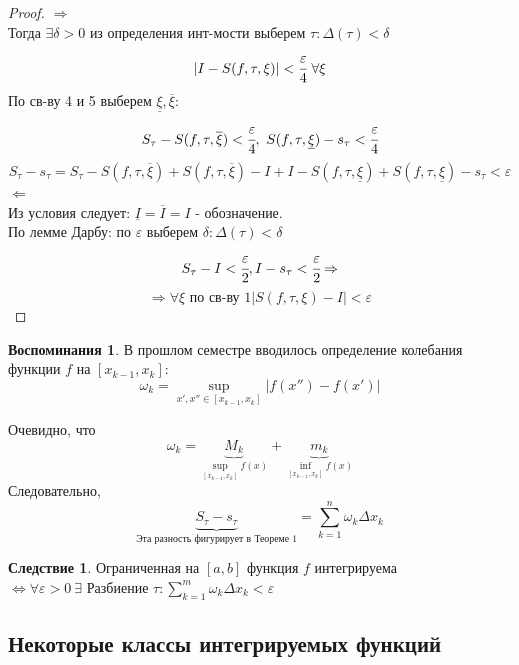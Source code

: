 \documentclass[a4paper]{article}
\theoremstyle{definition}
\newtheorem*{memories}{Воспоминания}
\newtheorem*{consequence*}{Следствие}
\newcommand\abs[1]{%
\mbox{$| #1 |$}}
\numberwithin{theorem}{subsection}
\numberwithin{lemma}{subsection}
\numberwithin{definition}{subsection}
\numberwithin{comment*}{subsection}
\numberwithin{consequence}{subsection}
\numberwithin{property}{subsection}
\begin{document}
\begin{proof}
 $\Rightarrow$\\
 Тогда $\exists{\delta}> 0 $ из определения инт-мости выберем $\tau: \Delta(\tau)< \delta \  $
 $$ \abs{I - S(f, \tau, \xi)} <\cfrac{\varepsilon}{4}\ \forall{\xi} $$
 По св-ву 4 и 5 выберем $\underline{\xi}, \overline{\xi}$:
 $$ S_\tau - S(f,\tau, \overline{\xi}) < \cfrac{\varepsilon}{4}, \ S(f, \tau, \underline{\xi})- s_\tau<\cfrac{\varepsilon}{4} $$
 $$S_\tau-s_\tau = S_\tau - S(f, \tau, \overline{\xi}) + S(f,\tau, \overline{\xi})- I + I - S(f,\tau, \underline{\xi}) +S(f,\tau, \underline{\xi}) -s_\tau < \varepsilon  $$
 $ \Leftarrow $\\
 Из условия следует: $\underline{I} = \overline{I} = I$ - обозначение. \\
 По лемме Дарбу: по $\varepsilon $ выберем $\delta: \Delta(\tau) < \delta$\\
 $$S_\tau - I < \cfrac{\varepsilon}{2}, I- s_\tau < \cfrac{\varepsilon}{2} \Rightarrow $$
 $$ \Rightarrow \forall{\xi} \text{ по св-ву 1} \abs{S(f,\tau,\xi) -I}<\varepsilon $$
\end{proof}
\begin{memories}
 В прошлом семестре вводилось определение колебания функции $f$ на $[x_{k-1}, x_k]$:
 $$ \omega_k = \sup_{x',x'' \in [x_{k-1}, x_k]} \abs{f(x'')-f(x')} $$
\end{memories}
Очевидно, что
$$ \omega_k = \underbrace{M_k}_{\sup_{[x_{k-1}, x_k]} f(x)} + \underbrace{m_k}_{\inf_{[x_{k-1}, x_k]} f(x)} $$
Следовательно,
$$ \underbrace{S_\tau - s_\tau}_{\text{Эта разность фигурирует в Теореме 1}} = \sum_{k=1}^{n}{\omega_k \Delta x_k} $$
\begin{consequence*}
 Ограниченная на $[a,b]$ функция $f$ интегрируема\\ $\Leftrightarrow \forall{\varepsilon} > 0 \ \exists{\text{ Разбиение }\tau}: \sum_{k=1}^{m}{\omega_k \Delta x_k} < \varepsilon$
\end{consequence*}
\subsection{Некоторые классы интегрируемых функций}
\end{document}
